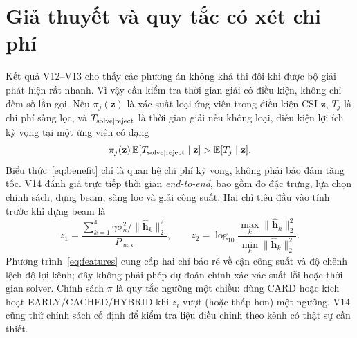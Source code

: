 \documentclass[11pt,onecolumn]{IEEEtran}
\begin{document}
\section{Giả thuyết và quy tắc có xét chi phí}
Kết quả V12--V13 cho thấy các phương án không khả thi đôi khi được bộ giải phát hiện rất nhanh. Vì vậy cần kiểm tra thời gian giải có điều kiện, không chỉ đếm số lần gọi. Nếu $\pi_j(\mathbf z)$ là xác suất loại ứng viên trong điều kiện CSI $\mathbf z$, $T_{j}$ là chi phí sàng lọc, và $T_{\rm solve\mid reject}$ là thời gian giải nếu không loại, điều kiện lợi ích kỳ vọng tại một ứng viên có dạng
\begin{equation}
\pi_j(\mathbf z)\,\mathbb E[T_{\rm solve\mid reject}\mid\mathbf z]
>\mathbb E[T_j\mid\mathbf z].\label{eq:benefit}
\end{equation}
Biểu thức~\eqref{eq:benefit} chỉ là quan hệ chi phí kỳ vọng, không phải bảo đảm tăng tốc. V14 đánh giá trực tiếp thời gian \emph{end-to-end}, bao gồm đo đặc trưng, lựa chọn chính sách, dựng beam, sàng lọc và giải công suất. Hai chỉ tiêu đầu vào tính trước khi dựng beam là
\begin{equation}
 z_1=\frac{\sum_{k=1}^{4}\gamma\sigma_n^2/\|\widehat{\mathbf h}_k\|_2^2}{P_{\max}},\qquad
 z_2=\log_{10}\frac{\max_k\|\widehat{\mathbf h}_k\|_2^2}{\min_k\|\widehat{\mathbf h}_k\|_2^2}.
\label{eq:features}
\end{equation}
Phương trình~\eqref{eq:features} cung cấp hai chỉ báo rẻ về cận công suất và độ chênh lệch độ lợi kênh; đây không phải phép dự đoán chính xác xác suất lỗi hoặc thời gian solver. Chính sách $\pi$ là quy tắc ngưỡng một chiều: dùng CARD hoặc kích hoạt EARLY/CACHED/HYBRID khi $z_i$ vượt (hoặc thấp hơn) một ngưỡng. V14 cũng thử chính sách cố định để kiểm tra liệu điều chỉnh theo kênh có thật sự cần thiết.
\end{document}
